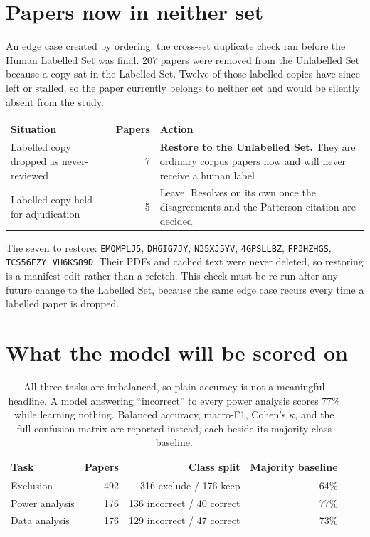 \documentclass[11pt]{article}
\begin{document}
\section{Papers now in neither set}
\label{sec:orphans}

An edge case created by ordering: the cross-set duplicate check ran before the Human Labelled Set was
final. 207 papers were removed from the Unlabelled Set because a copy sat in the Labelled Set. Twelve
of those labelled copies have since left or stalled, so the paper currently belongs to neither set and
would be silently absent from the study.

\begin{table}[h]
\centering
\begin{tabular}{lrp{7.2cm}}
\toprule
\textbf{Situation} & \textbf{Papers} & \textbf{Action} \\
\midrule
Labelled copy dropped as never-reviewed & 7 & \textbf{Restore to the Unlabelled Set.} They are ordinary corpus papers now and will never receive a human label \\
Labelled copy held for adjudication & 5 & Leave. Resolves on its own once the disagreements and the Patterson citation are decided \\
\bottomrule
\end{tabular}
\end{table}

\noindent
The seven to restore: \texttt{EMQMPLJ5}, \texttt{DH6IG7JY}, \texttt{N35XJ5YV}, \texttt{4GPSLLBZ},
\texttt{FP3HZHGS}, \texttt{TCS56FZY}, \texttt{VH6KS89D}. Their PDFs and cached text were never deleted,
so restoring is a manifest edit rather than a refetch. This check must be re-run after any future
change to the Labelled Set, because the same edge case recurs every time a labelled paper is dropped.

\section{What the model will be scored on}

\begin{table}[h]
\centering
\begin{tabular}{lrrr}
\toprule
\textbf{Task} & \textbf{Papers} & \textbf{Class split} & \textbf{Majority baseline} \\
\midrule
Exclusion      & 492 & 316 exclude / 176 keep    & 64\% \\
Power analysis & 176 & 136 incorrect / 40 correct & 77\% \\
Data analysis  & 176 & 129 incorrect / 47 correct & 73\% \\
\bottomrule
\end{tabular}
\caption{All three tasks are imbalanced, so plain accuracy is not a meaningful headline. A model
answering ``incorrect'' to every power analysis scores 77\% while learning nothing. Balanced accuracy,
macro-F1, Cohen's $\kappa$, and the full confusion matrix are reported instead, each beside its
majority-class baseline.}
\end{table}
\end{document}
